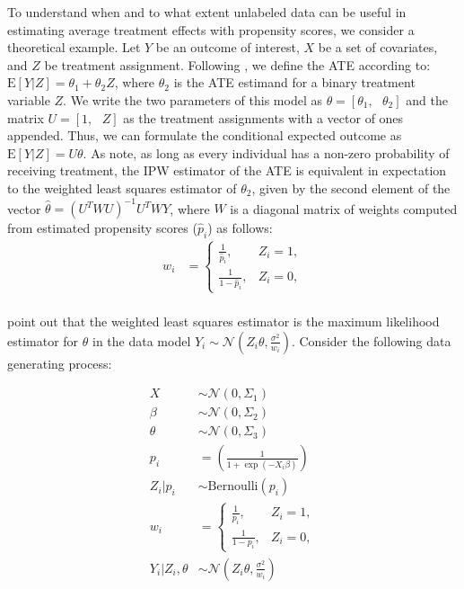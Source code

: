 \documentclass[aos]{imsart}
\newcommand{\Norm}{\mathcal{N}}
\newcommand{\E}{\mbox{E}}
\begin{document}
To understand when and to what extent unlabeled data can be useful in estimating average treatment effects with propensity scores, we consider a theoretical example. 
Let $Y$ be an outcome of interest, $X$ be a set of covariates, and $Z$ be treatment assignment. Following \cite{hernan2020causal}, we define the ATE according to: 
$\E[Y | Z] = \theta_1 + \theta_2 Z$, where $\theta_2$ is the ATE estimand for a binary treatment variable $Z$. 
We write the two parameters of this model as $\theta = [\theta_1, \textrm{ } \theta_2]$ and the matrix $U = [1, \textrm{ } Z]$ as the treatment assignments with a vector of 
ones appended. Thus, we can formulate the conditional expected outcome as $\E[Y | Z] = U\theta$. 
As \cite{hernan2020causal} note, as long as every individual has a non-zero probability of receiving treatment, the IPW estimator of the ATE is equivalent in expectation to 
the weighted least squares estimator of $\theta_2$, given by the second element of the vector $\hat{\theta} = \left(U^TWU\right)^{-1}U^TWY$, where $W$ is a 
diagonal matrix of weights computed from estimated propensity scores ($\hat{p}_i$) as follows:
\begin{equation*}
\begin{aligned}
w_i & = 
\begin{cases}
\frac{1}{\hat{p}_i},&  Z_i = 1,\\
\frac{1}{1 - \hat{p}_i},&  Z_i = 0,
\end{cases} \\
\end{aligned}
\end{equation*}

\cite{gelman2006data} point out that the weighted least squares estimator is the maximum likelihood estimator for 
$\theta$ in the data model $Y_i \sim \Norm(Z_i\theta, \frac{\sigma^2}{w_i})$. Consider the following data generating process:

\begin{equation*}
\begin{aligned}
X & \sim \Norm(0, \Sigma_1)\\
\beta & \sim \Norm(0, \Sigma_2)\\
\theta & \sim \Norm(0, \Sigma_3)\\
p_i & = \left(\frac{1}{1+\exp(-X_i\beta)}\right)\\
Z_i | p_i & \sim \textrm{Bernoulli}(p_i)\\
w_i & = 
\begin{cases}
\frac{1}{p_i},&  Z_i = 1,\\
\frac{1}{1 - p_i},&  Z_i = 0,
\end{cases} \\
Y_i | Z_i, \theta & \sim \Norm(Z_i\theta, \frac{\sigma^2}{w_i})\\
\end{aligned}
\end{equation*}
\end{document}
